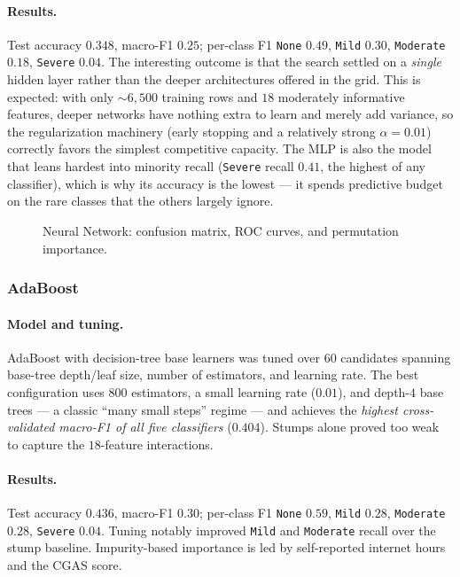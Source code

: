 \paragraph{Results.} Test accuracy $0.348$, macro-F1 $0.25$; per-class F1 \texttt{None} $0.49$, \texttt{Mild} $0.30$, \texttt{Moderate} $0.18$, \texttt{Severe} $0.04$. The interesting outcome is that the search settled on a \emph{single} hidden layer rather than the deeper architectures offered in the grid. This is expected: with only $\sim 6{,}500$ training rows and $18$ moderately informative features, deeper networks have nothing extra to learn and merely add variance, so the regularization machinery (early stopping and a relatively strong $\alpha=0.01$) correctly favors the simplest competitive capacity. The MLP is also the model that leans hardest into minority recall (\texttt{Severe} recall $0.41$, the highest of any classifier), which is why its accuracy is the lowest --- it spends predictive budget on the rare classes that the others largely ignore.

\begin{figure}[h]
    \centering
    \caption{Neural Network: confusion matrix, ROC curves, and permutation importance.}
    \label{fig:cmi_mlp}
\end{figure}

\subsubsection{AdaBoost}
\paragraph{Model and tuning.} AdaBoost with decision-tree base learners was tuned over $60$ candidates spanning base-tree depth/leaf size, number of estimators, and learning rate. The best configuration uses $800$ estimators, a small learning rate ($0.01$), and depth-$4$ base trees --- a classic ``many small steps'' regime --- and achieves the \emph{highest cross-validated macro-F1 of all five classifiers} ($0.404$). Stumps alone proved too weak to capture the $18$-feature interactions.
\paragraph{Results.} Test accuracy $0.436$, macro-F1 $0.30$; per-class F1 \texttt{None} $0.59$, \texttt{Mild} $0.28$, \texttt{Moderate} $0.28$, \texttt{Severe} $0.04$. Tuning notably improved \texttt{Mild} and \texttt{Moderate} recall over the stump baseline. Impurity-based importance is led by self-reported internet hours and the CGAS score.

